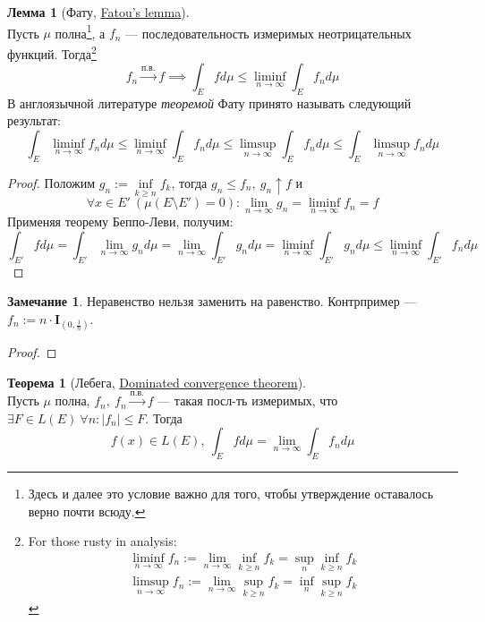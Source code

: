 \documentclass[11pt,a4paper]{report}
\theoremstyle{definition}
\theoremstyle{definition}
\newtheorem{theorem}{Теорема}[section]
\newtheorem{lemma}{Лемма}[section]
\newtheorem{remark}{Замечание}[section]
\theoremstyle{definition}
\begin{document}
	\begin{lemma}[Фату, \href{https://goo.gl/cRrc9V}{Fatou's lemma}]$  $\\
		Пусть $ \mu $ полна\footnote{Здесь и далее это условие важно для того, чтобы утверждение оставалось верно почти всюду.}, а $ f_{n} $ — последовательность измеримых неотрицательных функций. Тогда\footnote{For those rusty in analysis: 
			\begin{gather*} 
				\liminf\limits_{n\to\infty} f_{n} := \lim\limits_{n\to\infty}\inf\limits_{k \ge n} f_{k} = \sup\limits_{n} \inf\limits_{k \ge n} f_{k} \\ 
				\limsup\limits_{n\to\infty} f_{n} := \lim\limits_{n\to\infty}\sup\limits_{k \ge n} f_{k} = \inf\limits_{n} \sup_{k \ge n} f_{k}
			\end{gather*}
		}
		\[ f_{n} \xrightarrow{\text{п.в.}} f \implies \int_{E} f d\mu \le \liminf\limits_{n\to\infty}\int_{E} f_{n} d\mu \]
		В англоязычной литературе \textit{теоремой} Фату принято называть следующий результат:
		\[ 
			\int_{E} \liminf\limits_{n\to\infty} f_{n} d\mu \le \liminf\limits_{n\to\infty} \int_{E} f_{n} d\mu \le \limsup\limits_{n\to\infty} \int_{E} f_{n} d\mu \le \int_{E} \limsup\limits_{n\to\infty} f_{n} d\mu
		\]
	\end{lemma}
	\begin{proof}
		Положим $ g_{n} := \inf\limits_{k \ge n} f_{k} $, тогда $ g_{n} \le f_{n},\ g_{n} \uparrow f $ и 
		\[ 
			\forall x \in E'\
			 (\mu(E \setminus E') = 0): \lim\limits_{n\to\infty} g_{n} = \liminf\limits_{n\to\infty} f_{n} = f 
		\]
		Применяя теорему Беппо-Леви, получим:
		\[
			\int_{E'} f d\mu = \int_{E'} \lim\limits_{n\to\infty} g_{n} d\mu = \lim\limits_{n\to\infty}\int_{E'} g_{n}d\mu = \liminf\limits_{n\to\infty}\int_{E'} g_{n}d\mu \le \liminf\limits_{n\to\infty}\int_{E'} f_{n}d\mu
		\]
	\end{proof}
	\begin{remark}
		Неравенство нельзя заменить на равенство. Контрпример — $ f_{n} := n \cdot \mathbf{I}_{\left (0, \frac{1}{n}\right )} $.
	\end{remark}
	\begin{proof}
	\end{proof}
	\begin{theorem}[Лебега, \href{https://en.wikipedia.org/wiki/Dominated_convergence_theorem}{Dominated convergence theorem}]$  $\\
		Пусть $ \mu $ полна, $ f_{n},\ f_{n} \xrightarrow{\text{п.в.}} f $ — такая посл-ть измеримых, что $ \exists F \in L(E)\ \forall n: |f_{n}| \le F $. Тогда
		\[ 
			f(x) \in L(E),\ \int_{E} f d\mu = \lim\limits_{n\to\infty} \int_{E} f_{n} d\mu
		\]
	\end{theorem}
\end{document}
